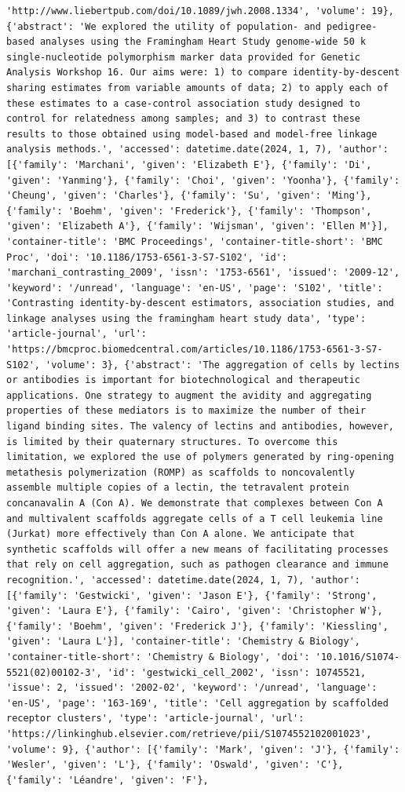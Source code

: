 \documentclass[
  12pt,
]
{article}
\begin{document}
\begin{verbatim}
'http://www.liebertpub.com/doi/10.1089/jwh.2008.1334', 'volume': 19}, {'abstract': 'We explored the utility of population- and pedigree-based analyses using the Framingham Heart Study genome-wide 50 k single-nucleotide polymorphism marker data provided for Genetic Analysis Workshop 16. Our aims were: 1) to compare identity-by-descent sharing estimates from variable amounts of data; 2) to apply each of these estimates to a case-control association study designed to control for relatedness among samples; and 3) to contrast these results to those obtained using model-based and model-free linkage analysis methods.', 'accessed': datetime.date(2024, 1, 7), 'author': [{'family': 'Marchani', 'given': 'Elizabeth E'}, {'family': 'Di', 'given': 'Yanming'}, {'family': 'Choi', 'given': 'Yoonha'}, {'family': 'Cheung', 'given': 'Charles'}, {'family': 'Su', 'given': 'Ming'}, {'family': 'Boehm', 'given': 'Frederick'}, {'family': 'Thompson', 'given': 'Elizabeth A'}, {'family': 'Wijsman', 'given': 'Ellen M'}], 'container-title': 'BMC Proceedings', 'container-title-short': 'BMC Proc', 'doi': '10.1186/1753-6561-3-S7-S102', 'id': 'marchani_contrasting_2009', 'issn': '1753-6561', 'issued': '2009-12', 'keyword': '/unread', 'language': 'en-US', 'page': 'S102', 'title': 'Contrasting identity-by-descent estimators, association studies, and linkage analyses using the framingham heart study data', 'type': 'article-journal', 'url': 'https://bmcproc.biomedcentral.com/articles/10.1186/1753-6561-3-S7-S102', 'volume': 3}, {'abstract': 'The aggregation of cells by lectins or antibodies is important for biotechnological and therapeutic applications. One strategy to augment the avidity and aggregating properties of these mediators is to maximize the number of their ligand binding sites. The valency of lectins and antibodies, however, is limited by their quaternary structures. To overcome this limitation, we explored the use of polymers generated by ring-opening metathesis polymerization (ROMP) as scaffolds to noncovalently assemble multiple copies of a lectin, the tetravalent protein concanavalin A (Con A). We demonstrate that complexes between Con A and multivalent scaffolds aggregate cells of a T cell leukemia line (Jurkat) more effectively than Con A alone. We anticipate that synthetic scaffolds will offer a new means of facilitating processes that rely on cell aggregation, such as pathogen clearance and immune recognition.', 'accessed': datetime.date(2024, 1, 7), 'author': [{'family': 'Gestwicki', 'given': 'Jason E'}, {'family': 'Strong', 'given': 'Laura E'}, {'family': 'Cairo', 'given': 'Christopher W'}, {'family': 'Boehm', 'given': 'Frederick J'}, {'family': 'Kiessling', 'given': 'Laura L'}], 'container-title': 'Chemistry & Biology', 'container-title-short': 'Chemistry & Biology', 'doi': '10.1016/S1074-5521(02)00102-3', 'id': 'gestwicki_cell_2002', 'issn': 10745521, 'issue': 2, 'issued': '2002-02', 'keyword': '/unread', 'language': 'en-US', 'page': '163-169', 'title': 'Cell aggregation by scaffolded receptor clusters', 'type': 'article-journal', 'url': 'https://linkinghub.elsevier.com/retrieve/pii/S1074552102001023', 'volume': 9}, {'author': [{'family': 'Mark', 'given': 'J'}, {'family': 'Wesler', 'given': 'L'}, {'family': 'Oswald', 'given': 'C'}, {'family': 'Léandre', 'given': 'F'}, 
\end{verbatim}
\end{document}
